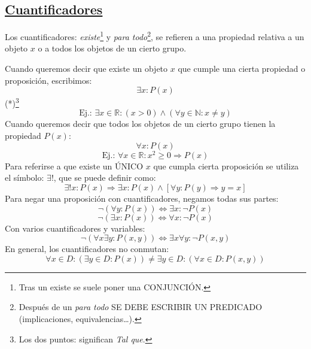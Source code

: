 \documentclass[10pt,a4paper,openright]{book}
\begin{document}
\subsection*{\underline{Cuantificadores}}
Los cuantificadores: \textit{existe}\footnote{Tras un existe se suele poner una CONJUNCIÓN.} y \textit{para todo}\footnote{Después de un \textit{para todo} SE DEBE ESCRIBIR UN PREDICADO (implicaciones, equivalencias…).}, se refieren a una propiedad relativa a un objeto $x$ o a todos los objetos de un cierto grupo.\par
Cuando queremos decir que existe un objeto $x$ que cumple una cierta propiedad o proposición, escribimos:
$$\exists x : P(x)$$
\scriptsize{(*)}\footnote{Los dos puntos:  significan \textit{Tal que}.}
\normalsize
$$\mbox{Ej.: } \exists x \in \mathbb R : (x>0) \wedge (\forall y \in \mathbb N : x \neq y)$$
Cuando queremos decir que todos los objetos de un cierto grupo tienen la propiedad $P(x)$:
$$\forall x : P(x)$$
$$\mbox{Ej.: }\forall x \in \mathbb R : x^2 \geq 0 \Rightarrow P(x)$$
Para referirse a que existe un ÚNICO $x$ que cumpla cierta proposición se utiliza el símbolo: $\exists !$, que se puede definir como: 
$$\exists !x : P(x)\Rightarrow \exists x : P(x) \wedge [\forall y : P(y) \Rightarrow y=x]$$
Para negar una proposición con cuantificadores, negamos todas sus partes:
$$\neg (\forall y : P(x))\Leftrightarrow \exists x : \neg P(x)$$
$$\neg (\exists x : P(x))\Leftrightarrow \forall x : \neg P(x)$$
Con varios cuantificadores y variables:
$$\neg (\forall x \exists y : P(x,y)) \Leftrightarrow \exists x \forall y : \neg P(x,y)$$
En general, los cuantificadores no conmutan:
$$\forall x \in D : (\exists y \in D : P(x))\neq \exists y \in D : (\forall x \in D : P(x,y))$$
\end{document}
